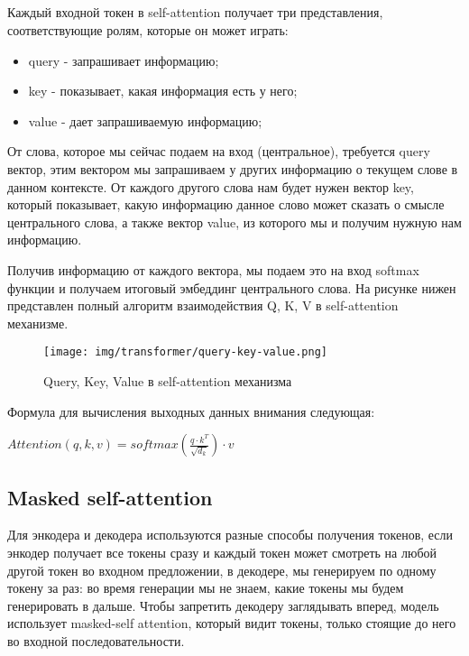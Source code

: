 \documentclass[PMI,VKR]{HSEUniversity}
\begin{document}
\newpage
\subsection{}

Каждый входной токен в self-attention получает три представления, соответствующие ролям, которые он может играть:
\begin{itemize}
    \item query - запрашивает информацию;
    \item key - показывает, какая информация есть у него;
    \item value - дает запрашиваемую информацию;
\end{itemize}

От слова, которое мы сейчас подаем на вход (центральное), требуется query вектор, этим вектором мы запрашиваем у других информацию о текущем слове в данном контексте. От каждого другого слова нам будет нужен вектор key, который показывает, какую информацию данное слово может сказать о смысле центрального слова, а также вектор value, из которого мы и получим нужную нам информацию.

Получив информацию от каждого вектора, мы подаем это на вход softmax функции и получаем итоговый эмбеддинг центрального слова. 
На рисунке нижен представлен полный алгоритм взаимодействия Q, K, V в self-attention механизме. 

\newpage
\begin{figure}[h]
    \centering
    \texttt{[image: img/transformer/query-key-value.png]}
    \caption{Query, Key, Value в self-attention механизма}
\end{figure}

Формула для вычисления выходных данных внимания следующая:

\begin{center}
$Attention(q, k, v) = softmax(\frac{q \cdot k^T}{\sqrt{d_k}}) \cdot v $
\end{center}

\subsection{Masked self-attention}

Для энкодера и декодера используются разные способы получения токенов, если энкодер получает все токены сразу и каждый токен может смотреть на любой другой токен во входном предложении, в декодере, мы генерируем по одному токену за раз: во время генерации мы не знаем, какие токены мы будем генерировать в дальше.
Чтобы запретить декодеру заглядывать вперед, модель использует masked-self attention, который видит токены, только стоящие до него во входной последовательности.
\end{document}
